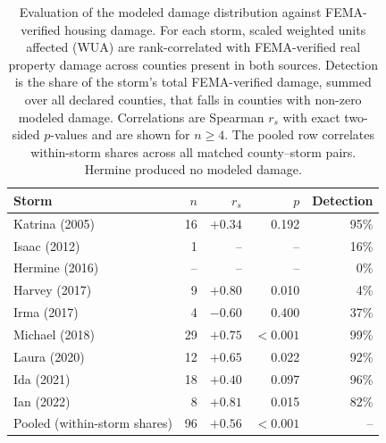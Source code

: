 \begin{table}[htb!]
\centering
\caption{Evaluation of the modeled damage distribution against
FEMA-verified housing damage. For each storm, scaled weighted units
affected (WUA) are rank-correlated with FEMA-verified real property
damage across counties present in both sources. Detection is the share
of the storm's total FEMA-verified damage, summed over all declared
counties, that falls in counties with non-zero modeled damage.
Correlations are Spearman $r_s$ with exact two-sided $p$-values and are
shown for $n \geq 4$. The pooled row correlates within-storm shares
across all matched county--storm pairs. Hermine produced no modeled
damage.}
\label{tab:damage_distribution}
\begin{tabular}{lrrrr}
\hline
Storm & $n$ & $r_s$ & $p$ & Detection \\
\hline
Katrina (2005) & 16 & $+0.34$ & 0.192 & 95\% \\
Isaac (2012) & 1 & -- & -- & 16\% \\
Hermine (2016) & -- & -- & -- & 0\% \\
Harvey (2017) & 9 & $+0.80$ & 0.010 & 4\% \\
Irma (2017) & 4 & $-0.60$ & 0.400 & 37\% \\
Michael (2018) & 29 & $+0.75$ & $<0.001$ & 99\% \\
Laura (2020) & 12 & $+0.65$ & 0.022 & 92\% \\
Ida (2021) & 18 & $+0.40$ & 0.097 & 96\% \\
Ian (2022) & 8 & $+0.81$ & 0.015 & 82\% \\
Pooled (within-storm shares) & 96 & $+0.56$ & $<0.001$ & -- \\
\hline
\end{tabular}
\end{table}
